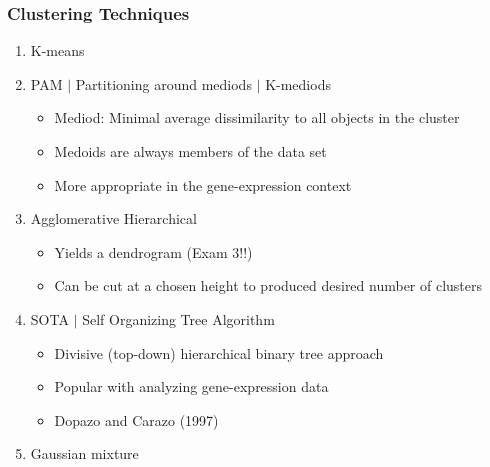 \documentclass[10pt,dvipsnames,table]{beamer}
\begin{document}
\begin{frame}
\frametitle{Clustering Techniques}
\begin{enumerate}
\pause \item K-means
\pause \item PAM $|$ Partitioning around mediods $|$ K-mediods
\begin{itemize}
\item Mediod: Minimal average dissimilarity to all objects in the cluster
\item Medoids are always members of the data set
\item More appropriate in the gene-expression context
\end{itemize}
\pause \item Agglomerative Hierarchical
\begin{itemize}
\item Yields a dendrogram (Exam 3!!)
\item Can be cut at a chosen height to produced desired number of clusters
\end{itemize}
\pause \item SOTA $|$ Self Organizing Tree Algorithm
\begin{itemize}
\item Divisive (top-down) hierarchical binary tree approach
\item Popular with analyzing gene-expression data
\item Dopazo and Carazo (1997)
\end{itemize}
\pause \item Gaussian mixture
\end{enumerate}
\end{frame}
\end{document}
